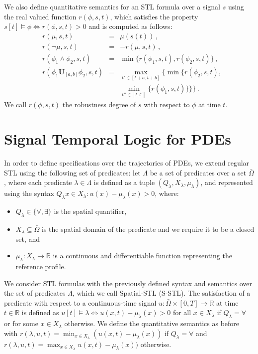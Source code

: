 \documentclass[letterpaper, 10 pt, conference]{ieeeconf/ieeeconf}
\newcommand*{\R}{\mathbb{R}}
\newcommand{\luntil}{\mathbf{U}}
\begin{document}
We also define quantitative semantics for an STL formula over a signal $s$
using the real valued function $r(\phi, s, t)$, which satisfies the property $s[t]
\models \phi \iff r(\phi,s, t) > 0$ and is computed as follows:
%
\begin{equation}
    \begin{aligned}
        &r(\mu, s, t) &= &\mu(s(t)) \,, \\
        &r(\lnot \mu, s, t) &= &-r(\mu, s,t) \,, \\
        &r(\phi_1 \land \phi_2, s, t) &= &\min\{r(\phi_1,s, t),
    r(\phi_2,s, t)\} \,, \\
    &r(\phi_1 \luntil_{[a,b]} \phi_2,s, t) &= 
    &\max_{t' \in [t+a, t+b]} \biggl\{ \min \bigl\{ r(\phi_2,s, t), \\
    & & &\min_{t'' \in [t, t']}\{r(\phi_1,s, t)\} \bigr\} \biggr\} \,.
    \end{aligned}
\end{equation}
%
We call $r(\phi,s, t)$ the robustness degree of $s$ with respect to $\phi$ at
time $t$.

\section{Signal Temporal Logic for PDEs}
\label{sec:signal_temporal_logic_for_pdes}

In order to define specifications over the trajectories of PDEs, we extend
regular STL using the following set of predicates:
let $\Lambda$ be a set of predicates over
a set $\bar\Omega$, where each predicate $\lambda \in \Lambda$ is defined as a
tuple $(Q_\lambda, X_\lambda, \mu_\lambda)$, 
and represented using the syntax $Q_\lambda x \in X_\lambda : u(x) - \mu_\lambda(x) >
0$, where:

\begin{itemize}
    \item $Q_\lambda \in \{\forall, \exists\}$ is the spatial quantifier,
    \item $X_\lambda \subseteq \bar\Omega$ is the spatial domain of the predicate and
        we require it to be a closed set, and 
    \item $\mu_\lambda : X_\lambda \to \R$ is a continuous and differentiable function 
        representing the reference profile.
\end{itemize}

We consider STL formulas 
with the previously defined syntax and semantics 
over the set of predicates $\Lambda$, which we call Spatial-STL (S-STL). The satisfaction of a
predicate with respect to a continuous-time signal $u : \bar\Omega \times [0, T]
\to \R$ at time $t \in \R$ is defined as $u[t] \models \lambda \iff 
u(x, t) - \mu_\lambda(x) > 0$ for all $x \in X_\lambda$ if $Q_\lambda = \forall$ or for some $x \in
X_\lambda$ otherwise. We define the quantitative semantics as before with
$r(\lambda,u, t) = \min_{x \in X_\lambda} (u(x, t) - \mu_\lambda(x))$ if $Q_\lambda = \forall$ and
$r(\lambda,u, t) = \max_{x \in X_\lambda} u(x, t) - \mu_\lambda(x))$ otherwise.
\end{document}
